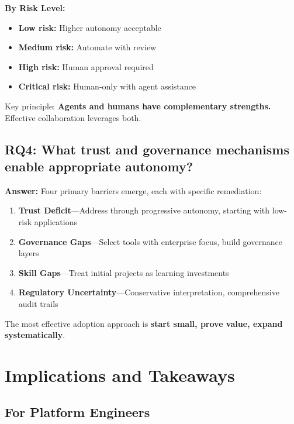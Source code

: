 \textbf{By Risk Level:}
\begin{itemize}
    \item \textbf{Low risk:} Higher autonomy acceptable
    \item \textbf{Medium risk:} Automate with review
    \item \textbf{High risk:} Human approval required
    \item \textbf{Critical risk:} Human-only with agent assistance
\end{itemize}

Key principle: \textbf{Agents and humans have complementary strengths.} Effective collaboration leverages both.

\subsection{RQ4: What trust and governance mechanisms enable appropriate autonomy?}
\label{subsec:rq4-answer}

\textbf{Answer:} Four primary barriers emerge, each with specific remediation:

\begin{enumerate}
    \item \textbf{Trust Deficit}---Address through progressive autonomy, starting with low-risk applications
    \item \textbf{Governance Gaps}---Select tools with enterprise focus, build governance layers
    \item \textbf{Skill Gaps}---Treat initial projects as learning investments
    \item \textbf{Regulatory Uncertainty}---Conservative interpretation, comprehensive audit trails
\end{enumerate}

The most effective adoption approach is \textbf{start small, prove value, expand systematically}.

\section{Implications and Takeaways}
\label{sec:implications}

\subsection{For Platform Engineers}
\label{subsec:for-engineers}

